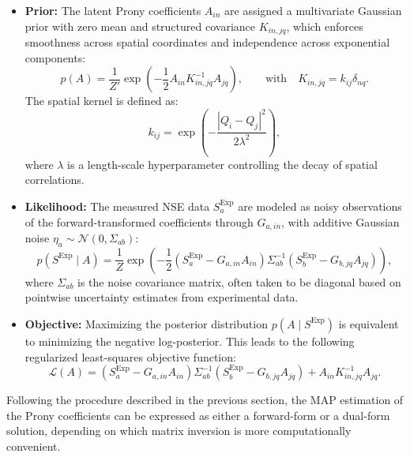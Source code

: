 \documentclass[12pt]{article}
\begin{document}
\begin{itemize}
    \item \textbf{Prior:} The latent Prony coefficients \( A_{in} \) are assigned a multivariate Gaussian prior with zero mean and structured covariance \( K_{in,jq} \), which enforces smoothness across spatial coordinates and independence across exponential components:
    \begin{equation}
        p(A) = \frac{1}{Z'} \exp\left( -\frac{1}{2} A_{in} K^{-1}_{in,jq} A_{jq} \right), \qquad \text{with} \quad K_{in,jq} = k_{ij} \delta_{nq}.
    \end{equation}
    The spatial kernel is defined as:
    \begin{equation}
        k_{ij} = \exp\left(-\frac{|Q_i - Q_j|^2}{2\lambda^2} \right),
    \end{equation}
    where \( \lambda \) is a length-scale hyperparameter controlling the decay of spatial correlations.

    \item \textbf{Likelihood:} The measured NSE data \( S_a^{\mathrm{Exp}} \) are modeled as noisy observations of the forward-transformed coefficients through \( G_{a,in} \), with additive Gaussian noise \( \eta_a \sim \mathcal{N}(0, \Sigma_{ab}) \):
    \begin{equation}
        p(S^{\mathrm{Exp}} \mid A) = \frac{1}{Z} \exp\left( -\frac{1}{2} (S_a^{\mathrm{Exp}} - G_{a,in} A_{in}) \Sigma^{-1}_{ab} (S_b^{\mathrm{Exp}} - G_{b,jq} A_{jq}) \right),
    \end{equation}
    where \( \Sigma_{ab} \) is the noise covariance matrix, often taken to be diagonal based on pointwise uncertainty estimates from experimental data.

    \item \textbf{Objective:} Maximizing the posterior distribution \( p(A \mid S^{\mathrm{Exp}}) \) is equivalent to minimizing the negative log-posterior. This leads to the following regularized least-squares objective function:
    \begin{equation}
        \mathcal{L}(A) = (S_a^{\mathrm{Exp}} - G_{a,in} A_{in}) \Sigma^{-1}_{ab} (S_b^{\mathrm{Exp}} - G_{b,jq} A_{jq}) + A_{in} K^{-1}_{in,jq} A_{jq}.
    \end{equation}
\end{itemize}

Following the procedure described in the previous section, the MAP estimation of the Prony coefficients can be expressed as either a forward-form or a dual-form solution, depending on which matrix inversion is more computationally convenient.
\end{document}
